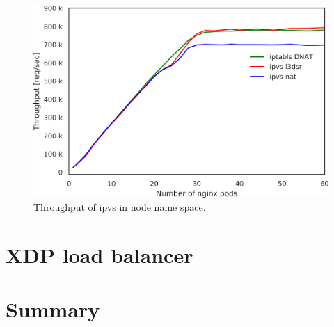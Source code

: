 \begin{figure}[h]
  \centering
  \includegraphics[width=0.8\columnwidth]{Figs/ipvs_node_l3dsr_10g}
  \caption{Throughput of ipvs in node name space.}
  \label{Figs/ipvs_node_l3dsr_10g}
\end{figure}


\FloatBarrier
\section{XDP load balancer}

\section{Summary}



